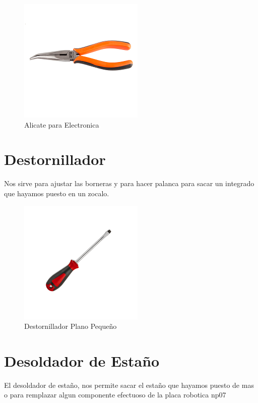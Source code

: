 \begin{figure}[h]
	\centering
	\includegraphics[width=0.5\linewidth]{herramientas/pinza}
	\caption{Alicate para Electronica}
	\label{fig:pinza}
\end{figure}

\newpage

\section{Destornillador}

Nos sirve para ajustar las borneras y para hacer palanca para sacar un integrado que hayamos puesto en un zocalo.

\begin{figure}[h]
	\centering
	\includegraphics[width=0.5\linewidth]{herramientas/destornillador}
	\caption{Destornillador Plano Pequeño}
	\label{fig:destornillador}
\end{figure}

\newpage

\section{Desoldador de Estaño}

El desoldador de estaño, nos permite sacar el estaño que hayamos puesto de mas o para remplazar algun componente efectuoso de la placa robotica np07

